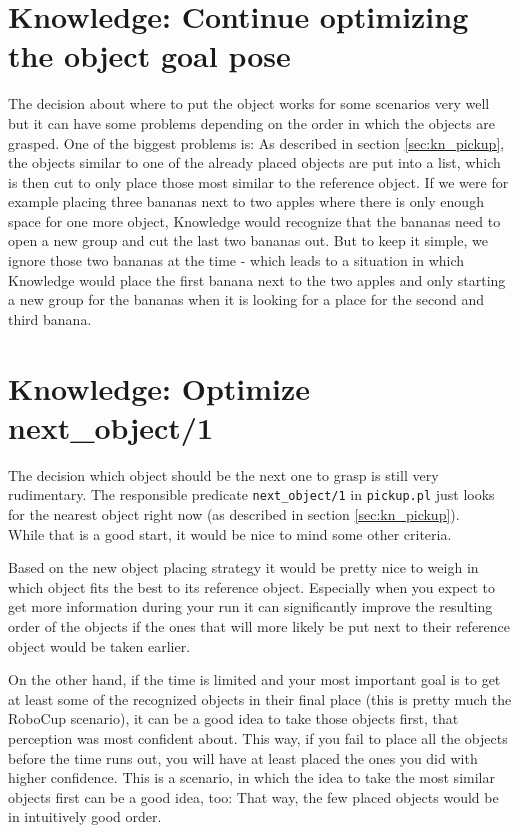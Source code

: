 \documentclass[main.tex]{subfiles}
\begin{document}
		\section{Knowledge: Continue optimizing the object goal pose}
		The decision about where to put the object works for some scenarios very well but it can have some problems depending on the order in which the objects are grasped. One of the biggest problems is: As described in section \ref{sec:kn_pickup}, the objects similar to one of the already placed objects are put into a list, which is then cut to only place those most similar to the reference object. If we were for example placing three bananas next to two apples where there is only enough space for one more object, Knowledge would recognize that the bananas need to open a new group and cut the last two bananas out. But to keep it simple, we ignore those two bananas at the time - which leads to a situation in which Knowledge would place the first banana next to the two apples and only starting a new group for the bananas when it is looking for a place for the second and third banana.
	  	
	  	\section{Knowledge: Optimize next\_object/1}\label{sec:nextObj}
	  	The decision which object should be the next one to grasp is still very rudimentary. The responsible predicate \texttt{next\_object/1} in \texttt{pickup.pl} just looks for the nearest object right now (as described in section \ref{sec:kn_pickup}).\\
	  	While that is a good start, it would be nice to mind some other criteria.
	  	
	  	Based on the new object placing strategy it would be pretty nice to weigh in which object fits the best to its reference object. Especially when you expect to get more information during your run it can significantly improve the resulting order of the objects if the ones that will more likely be put next to their reference object would be taken earlier.
	  	
		On the other hand, if the time is limited and your most important goal is to get at least some of the recognized objects in their final place (this is pretty much the RoboCup scenario), it can be a good idea to take those objects first, that perception was most confident about. This way, if you fail to place all the objects before the time runs out, you will have at least placed the ones you did with higher confidence. This is a scenario, in which the idea to take the most similar objects first can be a good idea, too: That way, the few placed objects would be in intuitively good order.
		
\end{document}
